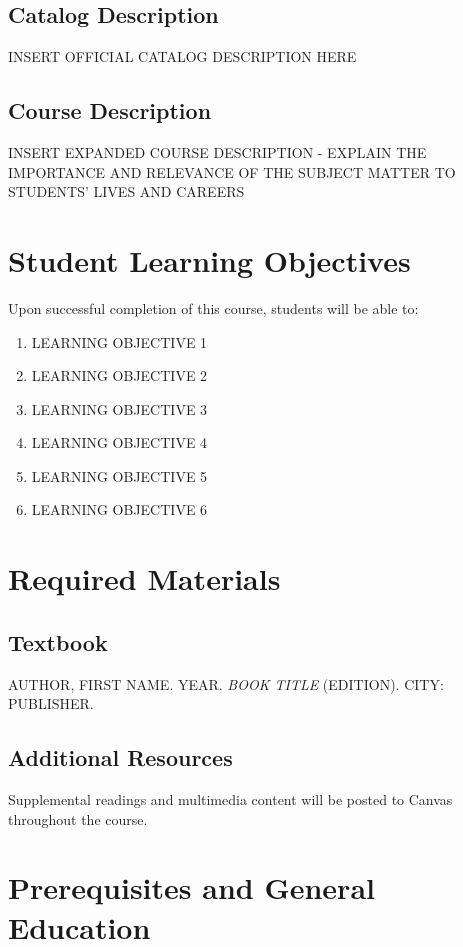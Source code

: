 \documentclass[12pt]{article}
\begin{document}
\subsection*{Catalog Description}
INSERT OFFICIAL CATALOG DESCRIPTION HERE

\subsection*{Course Description}
INSERT EXPANDED COURSE DESCRIPTION - EXPLAIN THE IMPORTANCE AND RELEVANCE OF THE SUBJECT MATTER TO STUDENTS' LIVES AND CAREERS

\section*{Student Learning Objectives}
Upon successful completion of this course, students will be able to:

\begin{enumerate}
\item LEARNING OBJECTIVE 1
\item LEARNING OBJECTIVE 2
\item LEARNING OBJECTIVE 3
\item LEARNING OBJECTIVE 4
\item LEARNING OBJECTIVE 5
\item LEARNING OBJECTIVE 6
\end{enumerate}

\section*{Required Materials}

\subsection*{Textbook}
AUTHOR, FIRST NAME. YEAR. \emph{BOOK TITLE} (EDITION). CITY: PUBLISHER.

\subsection*{Additional Resources}
Supplemental readings and multimedia content will be posted to Canvas throughout the course.

\section*{Prerequisites and General Education}
\end{document}
